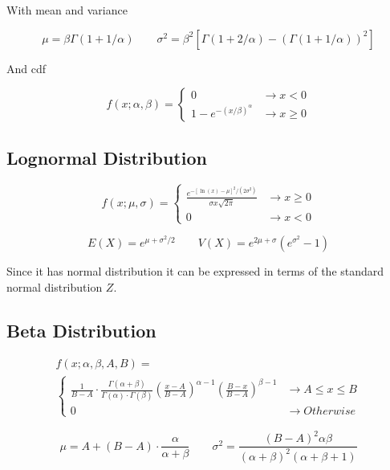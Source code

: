     With mean and variance

        \[
            \mu = \beta \Gamma ( 1 + 1/\alpha ) \qquad \sigma^2 = \beta^2 \left[ \Gamma(1 + 2/\alpha) - {\left( \Gamma(1 +
            1/\alpha) \right)}^2 \right]
        \]

    And cdf

        \[
            f(x; \alpha, \beta) = 
            \begin{cases}
                0 &\to x < 0\\
                1 - e^{-(x/\beta)^\alpha} &\to x \ge 0
            \end{cases}
        \]

    \subsection{Lognormal Distribution}
        \[
            f(x; \mu, \sigma) = 
            \begin{cases}
                \frac{e^{-[\ln(x) - \mu]^2/(2\sigma^2)}}{\sigma x \sqrt{2 \pi}} &\to x \ge 0\\
                0 &\to x < 0
            \end{cases}
        \]

        \[
            E(X) = e^{\mu + \sigma^2 / 2} \qquad V(X) = e^{2\mu + \sigma} \left( e^{\sigma^2} - 1\right)
        \]

    Since it has normal distribution it can be expressed in terms of the standard normal distribution $Z$.

    \subsection{Beta Distribution}
        \[
            \begin{aligned}
                f(x; \alpha, \beta, A, B) =\\
                \begin{cases}
                    \frac{1}{B-A} \cdot \frac{\Gamma(\alpha + \beta)}{\Gamma(\alpha) \cdot \Gamma(\beta)}
                    {\left( \frac{x - A}{B - A} \right)}^{\alpha - 1} {\left(\frac{B - x}{B - A}\right)}^{\beta - 1}
                    &\to A \le x \le B\\
                    0 &\to Otherwise
                \end{cases}
            \end{aligned}
        \]

        \[
            \mu = A + (B - A) \cdot \frac{\alpha}{\alpha + \beta} \qquad \sigma^2 = \frac{{(B - A)}^2 \alpha
        \beta}{{(\alpha+\beta)}^2 (\alpha + \beta + 1)}
        \]

